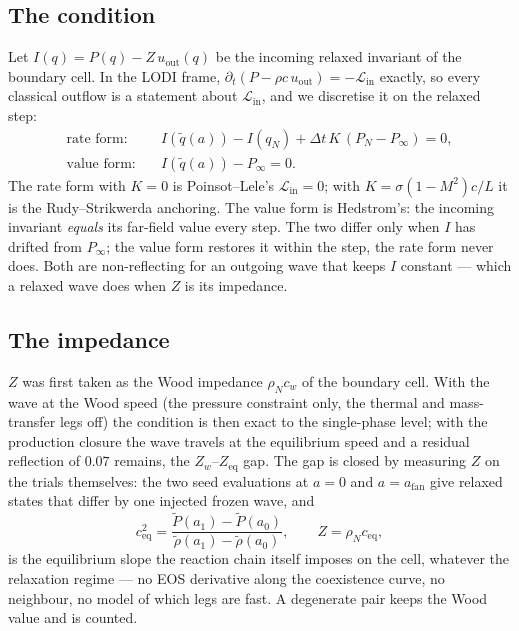 \documentclass[11pt,a4paper]{article}
\newcommand{\Lin}{\mathcal{L}_{\mathrm{in}}}
\newcommand{\uout}{u_{\mathrm{out}}}
\newcommand{\Pinf}{P_\infty}
\newcommand{\ceq}{c_{\mathrm{eq}}}
\newcommand{\cw}{c_{w}}
\begin{document}
\subsection{The condition}

Let $I(q) = P(q) - Z\,\uout(q)$ be the incoming relaxed invariant of the
boundary cell.  In the LODI frame,
$\partial_t(P - \rho c\,\uout) = -\Lin$ exactly, so every classical
outflow is a statement about $\Lin$, and we discretise it on the relaxed
step:
\begin{align}
  \text{rate form:}\quad & I(\tilde q(a)) - I(q_N) + \Delta t\,K\,(P_N - \Pinf) = 0, \label{eq:rate}\\
  \text{value form:}\quad & I(\tilde q(a)) - \Pinf = 0 . \label{eq:value}
\end{align}
The rate form with $K = 0$ is Poinsot--Lele's $\Lin = 0$; with
$K = \sigma(1-M^2)c/L$ it is the Rudy--Strikwerda anchoring.  The value
form is Hedstrom's: the incoming invariant \emph{equals} its far-field
value every step.  The two differ only when $I$ has drifted from
$\Pinf$; the value form restores it within the step, the rate form
never does.  Both are non-reflecting for an outgoing wave that keeps
$I$ constant --- which a relaxed wave does when $Z$ is its impedance.

\subsection{The impedance}

$Z$ was first taken as the Wood impedance $\rho_N\cw$ of the boundary
cell.  With the wave at the Wood speed (the pressure constraint only,
the thermal and mass-transfer legs off) the condition is then exact to
the single-phase level; with the production
closure the wave travels at the equilibrium speed and a residual
reflection of $0.07$ remains, the $Z_w$--$Z_{\mathrm{eq}}$ gap.  The gap
is closed by measuring $Z$ on the trials themselves: the two seed
evaluations at $a = 0$ and $a = a_{\mathrm{fan}}$ give relaxed states
that differ by one injected frozen wave, and
\begin{equation}
  \ceq^2 = \frac{\tilde P(a_1) - \tilde P(a_0)}{\tilde\rho(a_1) - \tilde\rho(a_0)},
  \qquad Z = \rho_N \ceq ,
  \label{eq:zeq}
\end{equation}
is the equilibrium slope the reaction chain itself imposes on the cell,
whatever the relaxation regime --- no EOS derivative along the
coexistence curve, no neighbour, no model of which legs are fast.  A
degenerate pair keeps the Wood value and is counted.
\end{document}
